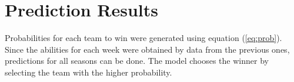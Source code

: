 \chapter{Prediction Results}\label{chapter:prediction_results}
Probabilities for each team to win were generated using equation (\ref{eq:prob}).  Since the abilities for each week were obtained by data from the previous ones, predictions for all seasons can be done.  The model chooses the winner by selecting the team with the higher probability.